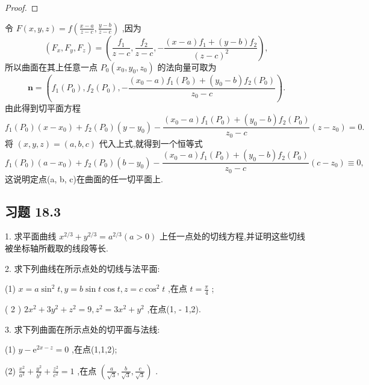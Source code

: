 \begin{proof}

\end{proof}
令 \(F\left( {x,y,z}\right)  = f\left( {\frac{x - a}{z - c},\frac{y - b}{z - c}}\right)\) ,因为
\[
\left( {{F}_{x},{F}_{y},{F}_{z}}\right)  = \left( {\frac{{f}_{1}}{z - c},\frac{{f}_{2}}{z - c}, - \frac{\left( {x - a}\right) {f}_{1} + \left( {y - b}\right) {f}_{2}}{{\left( z - c\right) }^{2}}}\right) ,
\]
所以曲面在其上任意一点 \({P}_{0}\left( {{x}_{0},{y}_{0},{z}_{0}}\right)\) 的法向量可取为
\[
\mathbf{n} = \left( {{f}_{1}\left( {P}_{0}\right) ,{f}_{2}\left( {P}_{0}\right) , - \frac{\left( {{x}_{0} - a}\right) {f}_{1}\left( {P}_{0}\right)  + \left( {{y}_{0} - b}\right) {f}_{2}\left( {P}_{0}\right) }{{z}_{0} - c}}\right) .
\]
由此得到切平面方程
\[
{f}_{1}\left( {P}_{0}\right) \left( {x - {x}_{0}}\right)  + {f}_{2}\left( {P}_{0}\right) \left( {y - {y}_{0}}\right)  - \frac{\left( {{x}_{0} - a}\right) {f}_{1}\left( {P}_{0}\right)  + \left( {{y}_{0} - b}\right) {f}_{2}\left( {P}_{0}\right) }{{z}_{0} - c}\left( {z - {z}_{0}}\right)  = 0.
\]
将 \(\left( {x,y,z}\right)  = \left( {a,b,c}\right)\) 代入上式,就得到一个恒等式
\[
{f}_{1}\left( {P}_{0}\right) \left( {a - {x}_{0}}\right)  + {f}_{2}\left( {P}_{0}\right) \left( {b - {y}_{0}}\right)  - \frac{\left( {{x}_{0} - a}\right) {f}_{1}\left( {P}_{0}\right)  + \left( {{y}_{0} - b}\right) {f}_{2}\left( {P}_{0}\right) }{{z}_{0} - c}\left( {c - {z}_{0}}\right)  \equiv  0,
\]
这说明定点(a, b, c)在曲面的任一切平面上.

\subsection{习题 18.3}

1. 求平面曲线 \({x}^{2/3} + {y}^{2/3} = {a}^{2/3}\left( {a > 0}\right)\) 上任一点处的切线方程,并证明这些切线被坐标轴所截取的线段等长.

2. 求下列曲线在所示点处的切线与法平面:

(1) \(x = a{\sin }^{2}t,y = b\sin t\cos t,z = c{\cos }^{2}t\) ,在点 \(t = \frac{\pi }{4}\) ;

( 2 ) \(2{x}^{2} + 3{y}^{2} + {z}^{2} = 9,{z}^{2} = 3{x}^{2} + {y}^{2}\) ,在点(1, - 1,2).

3. 求下列曲面在所示点处的切平面与法线:

(1) \(y - {\mathrm{e}}^{{2x} - z} = 0\) ,在点(1,1,2);

(2) \(\frac{{x}^{2}}{{a}^{2}} + \frac{{y}^{2}}{{b}^{2}} + \frac{{z}^{2}}{{c}^{2}} = 1\) ,在点 \(\left( {\frac{a}{\sqrt{3}},\frac{b}{\sqrt{3}},\frac{c}{\sqrt{3}}}\right)\) .

